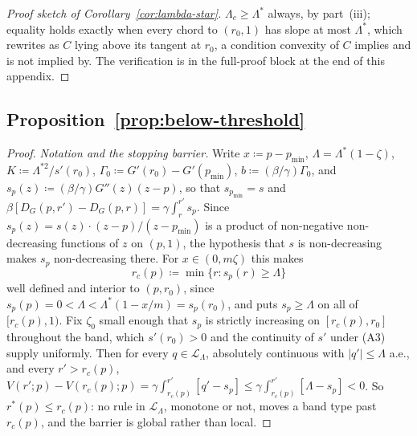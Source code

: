 \documentclass[acmsmall,nonacm,screen]{acmart}
\theoremstyle{acmplain}%
\theoremstyle{acmdefinition}%
\numberwithin{equation}{section}
\newcommand{\suppsec}[1]{the full-proof block at the end of this appendix}
\begin{document}
\begin{appendix}
\begin{proof}[Proof sketch of Corollary~\ref{cor:lambda-star}]
$\Lambda_c\geq\Lambda^*$ always, by part~(iii); equality holds exactly when every chord to $(r_0,1)$ has slope at most $\Lambda^*$, which rewrites as $C$ lying above its tangent at $r_0$, a condition convexity of $C$ implies and is not implied by. The verification is in \suppsec{S.11}.
\end{proof}


\subsection{Proposition~\ref{prop:below-threshold}}\label{app:below-threshold}

\begin{proof}
\emph{Notation and the stopping barrier.} Write $x\coloneqq p-p_{\min}$, $\Lambda=\Lambda^*(1-\zeta)$, $K\coloneqq\Lambda^{*2}/s'(r_0)$, $\Gamma_0\coloneqq G'(r_0)-G'(p_{\min})$, $b\coloneqq(\beta/\gamma)\Gamma_0$, and $s_p(z)\coloneqq(\beta/\gamma)G''(z)(z-p)$, so that $s_{p_{\min}}=s$ and $\beta[D_G(p,r')-D_G(p,r)]=\gamma\int_r^{r'}s_p$. Since $s_p(z)=s(z)\cdot(z-p)/(z-p_{\min})$ is a product of non-negative non-decreasing functions of $z$ on $(p,1)$, the hypothesis that $s$ is non-decreasing makes $s_p$ non-decreasing there. For $x\in(0,m\zeta)$ this makes
\begin{equation}\label{eq:stopping-barrier}
r_c(p)\coloneqq\min\{r:s_p(r)\geq\Lambda\}
\end{equation}
well defined and interior to $(p,r_0)$, since $s_p(p)=0<\Lambda<\Lambda^*(1-x/m)=s_p(r_0)$, and puts $s_p\geq\Lambda$ on all of $[r_c(p),1)$. Fix $\zeta_0$ small enough that $s_p$ is strictly increasing on $[r_c(p),r_0]$ throughout the band, which $s'(r_0)>0$ and the continuity of $s'$ under (A3) supply uniformly. Then for every $q\in\mathcal{L}_\Lambda$, absolutely continuous with $|q'|\leq\Lambda$ a.e., and every $r'>r_c(p)$, $V(r';p)-V(r_c(p);p)=\gamma\int_{r_c(p)}^{r'}[q'-s_p]\leq\gamma\int_{r_c(p)}^{r'}[\Lambda-s_p]<0$. So $r^*(p)\leq r_c(p)$: no rule in $\mathcal{L}_\Lambda$, monotone or not, moves a band type past $r_c(p)$, and the barrier is global rather than local.


\end{proof}
\end{appendix}
\end{document}
